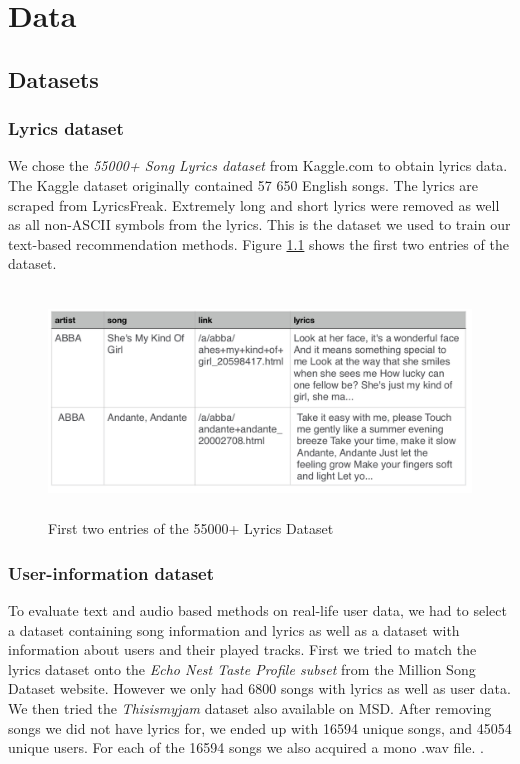 \chapter{Data}

\section{Datasets}

\subsection{Lyrics dataset}
 We chose the \textit{55000+ Song Lyrics dataset} from Kaggle.com to obtain lyrics data. The Kaggle dataset originally contained 57 650 English songs. The lyrics are scraped from LyricsFreak. Extremely long and short lyrics were removed as well as all non-ASCII symbols from the lyrics. This is the dataset we used to train our text-based recommendation methods. Figure \ref{fig:lyrics_dataset} shows the first two entries of the dataset.\\
 \begin{figure}[h]
    \centering
	\includegraphics[height=60mm]{./img/dataset_preview.png}
	\caption{First two entries of the 55000+ Lyrics Dataset}
	\label{fig:lyrics_dataset}
\end{figure}

\subsection{User-information dataset}
To evaluate text and audio based methods on real-life user data, we had to select a dataset containing song information and lyrics as well as a dataset with information about users and their played tracks. First we tried to match the lyrics dataset onto the \textit{Echo Nest Taste Profile subset} from the Million Song Dataset website. However we only had 6800 songs with lyrics as well as user data.  We then tried the \textit{Thisismyjam} dataset also available on MSD. After removing songs we did not have lyrics for, we ended up with 16594 unique songs, and 45054 unique users. For each of the 16594 songs we also acquired a mono .wav file. . \\

